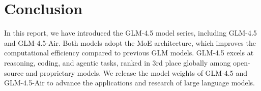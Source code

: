 \section{Conclusion}
In this report, we have introduced the GLM-4.5 model series, including GLM-4.5 and GLM-4.5-Air. Both models adopt the MoE architecture, which improves the computational efficiency compared to previous GLM models. GLM-4.5 excels at reasoning, coding, and agentic tasks, ranked in 3rd place globally among open-source and proprietary models. We release the model weights of GLM-4.5 and GLM-4.5-Air to advance the applications and research of large language models.